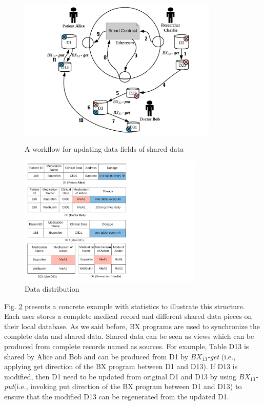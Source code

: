 \documentclass[conference]{IEEEtran}
\begin{document}
\begin{figure}[htbp]
	\centerline{\includegraphics[width=270pt,height=210pt]{updateScenario.pdf}}
	\caption{A workflow for updating data fields of shared data}
	\label{workflow}
\end{figure}

\begin{figure}[htbp]
	\centerline{\includegraphics[width=250pt]{medicalData.pdf}}
	\caption{Data distribution}
	\label{dataRepresentation}
\end{figure}

Fig. \ref{dataRepresentation} presents a concrete example with statistics to illustrate this structure. Each user stores a complete medical record and different shared data pieces on their local database.
As we said before, BX programs are used to synchronize the complete data and shared data. Shared data can be seen as views which can be produced from complete records named as sources. For example, Table D13 is shared by Alice and Bob and can be produced from D1 by \emph{$BX_{13}$-get} (i.e., applying get direction of the BX program between D1 and D13). If D13 is modified, then D1 need to be updated from original D1 and D13 by using  \emph{$BX_{13}$-put}(i.e., invoking put direction of the BX program between D1 and D13) to ensure that the modified D13 can be regenerated from the updated D1.  
\end{document}
